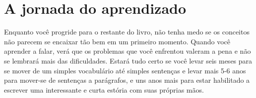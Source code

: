 \section{A jornada do aprendizado}
%

Enquanto você progride para o restante do livro, não tenha medo se os conceitos
não parecem se encaixar tão bem em um primeiro momento. Quando você aprender a falar,
verá que os problemas que você enfrentou valeram a pena e não se lembrará mais das 
dificuldades. Estará tudo certo se você levar seis meses para se mover de um simples
vocabulário até simples sentenças e levar mais 5-6 anos para mover-se de sentenças a
parágrafos, e uns anos mais para estar habilitado a escrever uma interessante e curta 
estória com suas próprias mãos.
%

